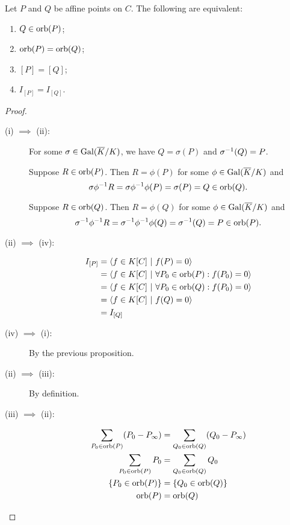 \begin{corollary}
  Let $P$ and $Q$ be affine points on $C$. The following are equivalent:
  \begin{enumerate}[label=(\roman*)]
    \item $Q \in \operatorname{orb}(P)$;
    \item $\operatorname{orb}(P) = \operatorname{orb}(Q)$;
    \item $[P] = [Q]$;
    \item $I_{[P]} = I_{[Q]}$.
  \end{enumerate}
\end{corollary}
\begin{proof}
  \begin{description}
    \item [(i) $\implies$ (ii):]
      For some $\sigma \in \operatorname{Gal}(\overline K/K)$, we have $Q = \sigma(P)$ and $\sigma^{-1}(Q) = P$.
      
      Suppose $R \in \operatorname{orb}(P)$.
      Then $R = \phi(P)$ for some $\phi \in \operatorname{Gal}(\overline K/K)$ and
      \[ \sigma\phi^{-1} R = \sigma\phi^{-1}\phi(P) = \sigma(P) = Q \in \operatorname{orb}(Q). \]
      
      Suppose $R \in \operatorname{orb}(Q)$.
      Then $R = \phi(Q)$ for some $\phi \in \operatorname{Gal}(\overline K/K)$ and
      \[ \sigma^{-1}\phi^{-1} R = \sigma^{-1}\phi^{-1}\phi(Q) = \sigma^{-1}(Q) = P \in \operatorname{orb}(P). \]
    

    \item [(ii) $\implies$ (iv):]
      \begin{align*}
        I_{[P]}
          &= \left\langle  f \in K[C] ~|~ f(P) = 0  \right\rangle \\
          &= \left\langle  f \in K[C] ~|~ \forall P_0 \in \operatorname{orb}(P) : f(P_0) = 0  \right\rangle \\
          &= \left\langle  f \in K[C] ~|~ \forall P_0 \in \operatorname{orb}(Q) : f(P_0) = 0  \right\rangle \\
          &= \left\langle  f \in K[C] ~|~ f(Q) = 0  \right\rangle \\
          &= I_{[Q]}
      \end{align*}
      
    \item [(iv) $\implies$ (i):]
      By the previous proposition.
    
    \item [(ii) $\implies$ (iii):]
      By definition.

    \item [(iii) $\implies$ (ii):]
      \begin{align*}
        \sum_{P_0 \in \operatorname{orb}(P)}(P_0 - P_\infty) &= \sum_{Q_0 \in \operatorname{orb}(Q)}(Q_0 - P_\infty) \\
        \sum_{P_0 \in \operatorname{orb}(P)}P_0 &= \sum_{Q_0 \in \operatorname{orb}(Q)}Q_0 \\
        \{P_0 \in \operatorname{orb}(P)\} &= \{Q_0 \in \operatorname{orb}(Q)\} \\
        \operatorname{orb}(P) &= \operatorname{orb}(Q)
      \end{align*}
  \end{description}
\end{proof}

